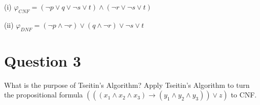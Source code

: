 \documentclass[12pt]{fphw}
\begin{document}
(i) $\varphi_{CNF} = (\neg p \vee q \vee \neg s \vee t) \wedge (\neg r \vee \neg s \vee t)$

(ii) $\varphi_{DNF} =(\neg p \wedge \neg r) \vee (q \wedge \neg r) \vee \neg s \vee t$

\newpage

\section*{Question 3}

\begin{problem}
  What is the purpose of Tseitin's Algorithm? Apply Tseitin's Algorithm to turn the propositional formula $(((x_1 \wedge x_2 \wedge x_3) \to (y_1 \wedge y_2 \wedge y_3)) \vee z)$ to CNF.
\end{problem}
\end{document}
